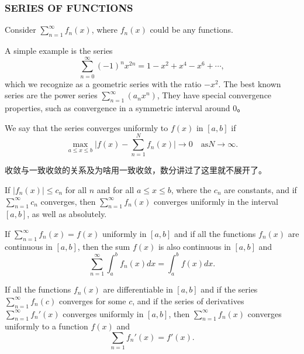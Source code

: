 \documentclass[hazy,blue,11pt]{elegantnote}
\begin{document}
\subsubsection{SERIES OF FUNCTIONS}
\begin{definition}
   Consider $\sum_{n=1}^{\infty}f_n(x)$, where $f_n(x)$ could be any functions.
\end{definition}
A simple example is the series 
\begin{equation}
    \sum\limits_{n=0}^{\infty}(-1)^{n}x^{2n}=1-x^2+x^4-x^6+\cdots,
\end{equation}
which we recognize as a geometric series with the ratio $-x^2$. The best
known series are the power series $\textstyle \sum_{n=1}^{\infty}(a_{n}x^{n})$, They have special convergence properties, such as convergence in a symmetric interval around $0$。
\begin{definition}
   We say that the series converges uniformly to $f(x)$ in $[a, b]$ if
\begin{equation}
    \max\limits_{a\le x\le b}\bigg|f(x)-\sum\limits_{n=1}^Nf_n(x)\bigg|\to0\quad\text{as}N\to\infty.
\end{equation}
\begin{note}
    收敛与一致收敛的关系及为啥用一致收敛，数分讲过了这里就不展开了。
\end{note}
\end{definition}

\begin{theorem}
   If $|f_n(x)| \le c_n$ for all $n$ and for all $a \le x \le b$, where
the $c_n$ are constants, and if $\sum_{n=1}^{\infty}c_n$ converges, then $\sum_{n=1}^{\infty}f_{n}(x)$ converges uniformly in the interval $[a, b]$, as well as absolutely.
\end{theorem}

\begin{theorem}
   If $\sum_{n=1}^\infty f_n(x) = f(x)$ uniformly in $[a,b]$ and if all the functions $f_n(x)$ are continuous in $[a,b]$, then the sum $f(x)$ is also continuous in $[a,b]$ and
\begin{equation}
    \sum\limits_{n=1}^\infty\int_a^b f_n(x)dx=\int_a^b f(x)dx.
\end{equation}
\end{theorem}

\begin{theorem}
  If all the functions $f_{n}(x)$ are differentiable in $[a,b]$ and if the series $\sum_{n=1}^{\infty}f_{n}(c)$ converges for some $c$, and if the series of derivatives $\sum_{n=1}^{\infty}f_n'(x)$ converges uniformly in $[a,b]$, then $\sum_{n=1}^{\infty}f_{n}(x)$ converges uniformly to a function $f(x)$ and
\begin{equation}
    \sum\limits_{n=1}f_n'(x)=f'(x).
\end{equation}
\end{theorem}
\end{document}
